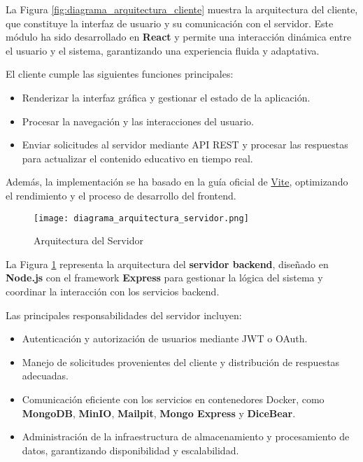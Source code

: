 La Figura \ref{fig:diagrama_arquitectura_cliente} muestra la arquitectura del
cliente, que constituye la interfaz de usuario y su comunicación con el
servidor. Este módulo ha sido desarrollado en \textbf{React} y permite una
interacción dinámica entre el usuario y el sistema, garantizando una experiencia
fluida y adaptativa.

El cliente cumple las siguientes funciones principales:
\begin{itemize}
    \item Renderizar la interfaz gráfica y gestionar el estado de la aplicación.
    \item Procesar la navegación y las interacciones del usuario.
    \item Enviar solicitudes al servidor mediante API REST y procesar las
    respuestas para actualizar el contenido educativo en tiempo real.
\end{itemize}

Además, la implementación se ha basado en la guía oficial de
\href{https://vite.dev/guide/}{Vite}, optimizando el rendimiento y el proceso de
desarrollo del frontend.

\begin{figure}[htbp]
    \centering
    \texttt{[image: diagrama\_arquitectura\_servidor.png]}
    \caption{Arquitectura del Servidor}
    \label{fig:diagrama_arquitectura_servidor}
\end{figure}

La Figura \ref{fig:diagrama_arquitectura_servidor} representa la arquitectura
del \textbf{servidor backend}, diseñado en \textbf{Node.js} con el framework
\textbf{Express} para gestionar la lógica del sistema y coordinar la interacción
con los servicios backend.

Las principales responsabilidades del servidor incluyen:
\begin{itemize}
    \item Autenticación y autorización de usuarios mediante JWT o OAuth.
    \item Manejo de solicitudes provenientes del cliente y distribución de
    respuestas adecuadas.
    \item Comunicación eficiente con los servicios en contenedores Docker, como
    \textbf{MongoDB}, \textbf{MinIO}, \textbf{Mailpit}, \textbf{Mongo Express} y
    \textbf{DiceBear}.
    \item Administración de la infraestructura de almacenamiento y procesamiento
    de datos, garantizando disponibilidad y escalabilidad.
\end{itemize}

